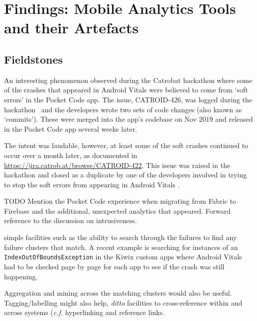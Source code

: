 \setchapterpreamble[u]{\margintoc}
\chapter{Findings: Mobile Analytics Tools and their Artefacts}

\section{Fieldstones}

An interesting phenomenon observed during the Catrobat hackathon where some of the crashes that appeared in Android Vitals were believed to come from `soft errors' in the Pocket Code app. The issue, CATROID-426, was logged during the hackathon~ and the developers wrote two sets of code changes (also known as `commits'). These were merged into the app's codebase on  Nov 2019 and released in the Pocket Code app several weeks later.

The intent was laudable, however, at least some of the soft crashes continued to occur over a month later, as documented in \url{https://jira.catrob.at/browse/CATROID-422}. This issue was raised in the hackathon and closed as a duplicate by one of the developers involved in trying to stop the soft errors from appearing in Android Vitals .

TODO Mention the Pocket Code experience when migrating from Fabric to Firebase and the additional, unexpected analytics that appeared. Forward reference to the discussion on intrusiveness.

\itools {} simple facilities such as the ability to search through the failures to find any failure clusters that match. A recent example is searching for instances of an \texttt{IndexOutOfBoundsException} in the Kiwix custom apps where Android Vitals had to be checked page by page for each app to see if the crash was still happening.

Aggregation and mining across the matching clusters would also be useful. Tagging/labelling might also help, \emph{ditto} facilities to cross-reference within and across systems (\emph{c.f.} hyperlinking and reference links.
